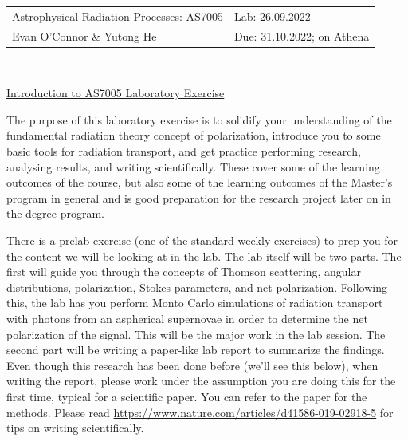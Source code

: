 \documentclass[12pt]{amsart}
\begin{document}
\noindent
\begin{tabular}{L{9.7cm} R{6.7cm}}
Astrophysical Radiation Processes: AS7005& Lab: 26.09.2022 \\
Evan O'Connor \& Yutong He & Due: 31.10.2022; on Athena\\
\end{tabular}\\

\vspace*{0.5cm}

\centerline{\Large \underline{Introduction to AS7005 Laboratory Exercise} }
\vspace*{0.5cm}

The purpose of this laboratory exercise is to solidify your
understanding of the fundamental radiation theory concept of
polarization, introduce you to some basic tools for radiation
transport, and get practice performing research, analysing results,
and writing scientifically.  These cover some of the learning outcomes
of the course, but also some of the learning outcomes of the Master's
program in general and is good preparation for the research project
later on in the degree program.  \newline

There is a prelab exercise (one of the standard weekly exercises) to
prep you for the content we will be looking at in the lab.  The lab
itself will be two parts.  The first will guide you through the
concepts of Thomson scattering, angular distributions, polarization,
Stokes parameters, and net polarization. Following this, the lab has
you perform Monto Carlo simulations of radiation transport with
photons from an aspherical supernovae in order to determine the net
polarization of the signal.  This will be the major work in the lab
session. The second part will be writing a paper-like lab report to
summarize the findings. Even though this research has been done before
(we'll see this below), when writing the report, please work under the
assumption you are doing this for the first time, typical for a
scientific paper. You can refer to the paper for the methods.  Please read
\mbox{\url{https://www.nature.com/articles/d41586-019-02918-5}} for
tips on writing scientifically.  \newline
\end{document}
